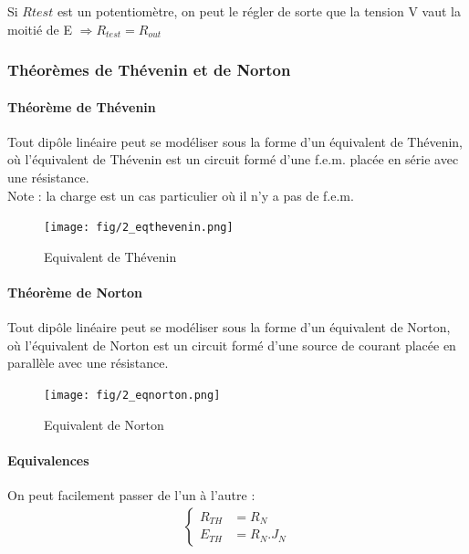 \documentclass[a4paper]{article}
\begin{document}
    Si $R{test}$ est un potentiomètre, on peut le régler de sorte que la tension
    V vaut la moitié de E $\Rightarrow R_{test} = R_{out}$

    \subsubsection{Théorèmes de Thévenin et de Norton}

    \paragraph{Théorème de Thévenin} Tout dipôle linéaire peut se modéliser
    sous la forme d'un équivalent de Thévenin, où l'équivalent de Thévenin
    est un circuit formé d'une f.e.m. placée en série avec une résistance.\\

    Note : la charge est un cas particulier où il n'y a pas de f.e.m.

    \begin{figure}[H]
        \begin{center}
            \texttt{[image: fig/2\_eqthevenin.png]}
            \caption{Equivalent de Thévenin}
            \label{fig:2_eqthevenin}
        \end{center}
    \end{figure}

    \paragraph{Théorème de Norton} Tout dipôle linéaire peut se modéliser
    sous la forme d'un équivalent de Norton, où l'équivalent de Norton
    est un circuit formé d'une source de courant placée en parallèle avec une résistance.

    \begin{figure}[H]
        \begin{center}
            \texttt{[image: fig/2\_eqnorton.png]}
            \caption{Equivalent de Norton}
            \label{fig:2_eqnorton}
        \end{center}
    \end{figure}

    \paragraph{Equivalences} On peut facilement passer de l'un à l'autre :
    \begin{align*}
        \begin{cases}
            R_{TH}&= R_N\\
            E_{TH}&= R_N . J_N
        \end{cases}
    \end{align*}
\end{document}
